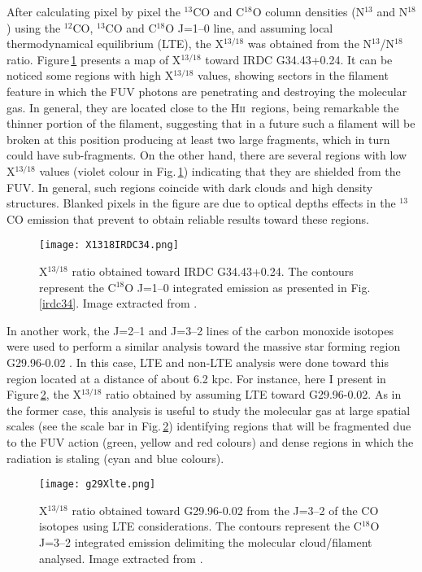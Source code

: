 \documentclass[baaa]{baaa}
\newcommand{\hii}{H\textsc{ii}}
\begin{document}
After calculating pixel by pixel the $^{13}$CO and C$^{18}$O column densities (N$^{13}$ and N$^{18}$) using the $^{12}$CO, $^{13}$CO and C$^{18}$O J=1--0 line, and assuming local thermodynamical equilibrium (LTE), the X$^{13/18}$ was obtained from the N$^{13}$/N$^{18}$ ratio. Figure\,\ref{xirdc34} presents a map of 
X$^{13/18}$ toward IRDC G34.43+0.24. It can be noticed some regions with high X$^{13/18}$ values, showing sectors in the filament feature in which the FUV photons are penetrating and destroying the molecular gas. In general, they are located close to the \hii~regions, being remarkable the thinner portion of the filament, suggesting that in a future such a filament will be broken at this position producing at least two large fragments, which in turn could have sub-fragments. On the other hand, there are several regions with low X$^{13/18}$ values (violet colour in Fig.\,\ref{xirdc34}) indicating that they are shielded from the FUV. In general, such regions coincide with dark clouds and high density structures. Blanked pixels in the figure are due to optical depths effects in the $^{13}$CO emission that prevent to obtain reliable results toward these regions.  


\begin{figure}[h]
\centering
\texttt{[image: X1318IRDC34.png]}
\caption{X$^{13/18}$ ratio obtained toward IRDC G34.43+0.24. The contours represent the C$^{18}$O J=1--0 integrated emission as presented in Fig.\,\ref{irdc34}. Image extracted from \citet{areal19}.}
\label{xirdc34}
\end{figure}

In another work, the J=2--1 and J=3--2 lines of the carbon monoxide isotopes were used to perform a similar analysis toward the massive star forming region G29.96-0.02 \citep{paron18}. In this case, LTE and non-LTE analysis were done toward this region located at a distance of about 6.2 kpc. For instance, here I present in Figure\,\ref{xg29}, the X$^{13/18}$ ratio obtained by assuming LTE
toward G29.96-0.02. As in the former case, this analysis is useful to study the molecular gas at large spatial scales (see the scale bar in Fig.\,\ref{xg29}) identifying regions that will be fragmented due to the FUV action (green, yellow and red colours) and dense regions in which the radiation is staling (cyan and blue colours). 

\begin{figure}[h]
\centering
\texttt{[image: g29Xlte.png]}
\caption{X$^{13/18}$ ratio obtained toward G29.96-0.02 from the J=3--2 of the CO isotopes using LTE considerations. The contours represent the C$^{18}$O J=3--2 integrated emission delimiting the molecular cloud/filament analysed. Image extracted from \citet{paron18}.}
\label{xg29}
\end{figure}
\end{document}
